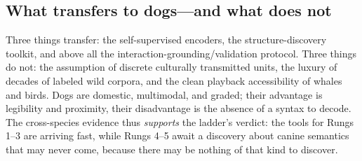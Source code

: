 \subsection{What transfers to dogs---and what does not}
Three things transfer: the self-supervised encoders, the structure-discovery
toolkit, and above all the interaction-grounding/validation protocol. Three
things do not: the assumption of discrete culturally transmitted units, the
luxury of decades of labeled wild corpora, and the clean playback
accessibility of whales and birds. Dogs are domestic, multimodal, and
graded; their advantage is legibility and proximity, their disadvantage is
the absence of a syntax to decode. The cross-species evidence thus
\emph{supports} the ladder's verdict: the tools for Rungs 1--3 are arriving
fast, while Rungs 4--5 await a discovery about canine semantics that may
never come, because there may be nothing of that kind to discover.

